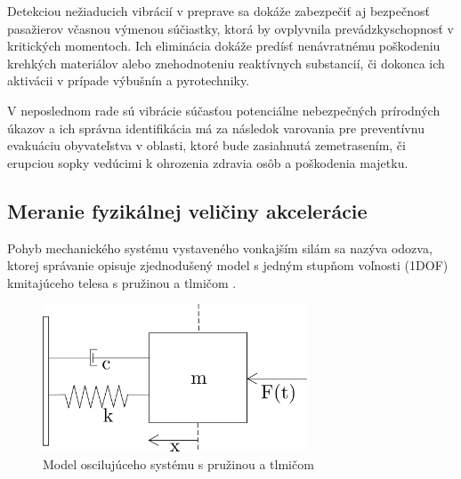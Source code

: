 Detekciou nežiaducich vibrácií v preprave sa dokáže zabezpečiť aj bezpečnosť pasažierov včasnou výmenou súčiastky, ktorá by ovplyvnila 
prevádzkyschopnosť v kritických momentoch. Ich eliminácia dokáže predísť nenávratnému poškodeniu krehkých materiálov alebo 
znehodnoteniu reaktívnych substancií, či dokonca ich aktivácii v prípade výbušnín a pyrotechniky.

V neposlednom rade sú vibrácie súčasťou potenciálne nebezpečných prírodných úkazov a ich správna identifikácia má za následok varovania 
pre preventívnu evakuáciu obyvateľstva v oblasti, ktoré bude zasiahnutá zemetrasením, či erupciou sopky vedúcimi k ohrozenia zdravia 
osôb a poškodenia majetku.
 
\subsection{Meranie fyzikálnej veličiny akcelerácie}
Pohyb mechanického systému vystaveného vonkajším silám sa nazýva odozva, ktorej správanie opisuje zjednodušený model s jedným stupňom 
voľnosti (1DOF) kmitajúceho telesa s pružinou a tlmičom \cite{vibrations-shock}. 

\begin{figure}[h]
	\centering
	\includegraphics[width=0.7\textwidth]{figures/mass-spring-damper-model.png}
	\caption{Model oscilujúceho systému s pružinou a tlmičom}
\end{figure}

